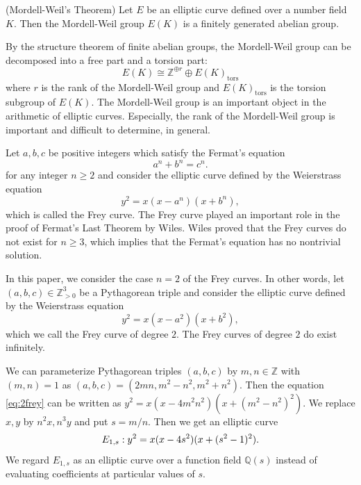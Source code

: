 \documentclass[main]{subfiles}
\begin{document}
\begin{thm}{(Mordell-Weil's Theorem)}
    \label{thm:mordell}
    Let $E$ be an elliptic curve defined over a number field $K$.
    Then the Mordell-Weil group $E(K)$ is a finitely generated abelian group.
\end{thm}
By the structure theorem of finite abelian groups, the Mordell-Weil group can be decomposed into a free part and a torsion part:
\begin{equation*}
    E(K) \cong \mathbb{Z}^{\oplus r} \oplus E(K)_{\text{tors}}
\end{equation*}
where $r$ is the rank of the Mordell-Weil group and $E(K)_{\text{tors}}$ is the torsion subgroup of $E(K)$.
The Mordell-Weil group is an important object in the arithmetic of elliptic curves.
Especially, the rank of the Mordell-Weil group is important and difficult to determine, in general.

Let $a,b,c$ be positive integers which satisfy the Fermat's equation
\begin{equation*}
    a^{n} + b^{n} = c^{n}.
\end{equation*}
for any integer $n \geq 2$ and consider the elliptic curve defined by the Weierstrass equation
\begin{equation*}
    y^{2} = x(x - a^{n})(x + b^{n}),
\end{equation*}
which is called the Frey curve.
The Frey curve played an important role in the proof of Fermat's Last Theorem by Wiles.
Wiles proved that the Frey curves do not exist for $n \geq 3$, which implies that the Fermat's equation has no nontrivial solution.

In this paper, we consider the case $n=2$ of the Frey curves.
In other words, let $(a,b,c) \in \mathbb{Z}_{> 0}^3$ be a Pythagorean triple and consider the elliptic curve defined by the Weierstrass equation
\begin{equation}
    \label{eq:2frey}
    y^{2} = x(x - a^{2})(x + b^{2}),
\end{equation}
which we call the Frey curve of degree $2$.
The Frey curves of degree $2$ do exist infinitely.

We can parameterize Pythagorean triples $(a,b,c)$ by $m,n \in \mathbb{Z}$ with $(m,n)=1$ as $(a,b,c) = (2mn, m^{2} - n^{2}, m^{2} + n^{2})$.
Then the equation \eqref{eq:2frey} can be written as $y^{2} = x(x - 4m^2n^2)(x + (m^{2} - n^2)^{2})$.
We replace $x,y$ by $n^2x, n^3y$ and put $s = m/n$.
Then we get an elliptic curve
\begin{equation}
    \label{eq:E_{1,s}}
    E_{1,s}: y^{2} = x(x - 4s^{2})(x + (s^{2} - 1)^{2}).
\end{equation}
We regard $E_{1,s}$ as an elliptic curve over a function field $\mathbb{Q}(s)$ instead of evaluating coefficients at particular values of $s$.
\end{document}
